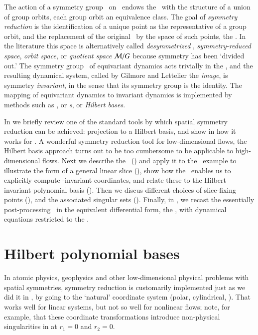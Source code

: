 
The action of a symmetry group \Group\ on \pS\ endows the \statesp\ with the structure of a union of group orbits, each group orbit an equivalence class. The goal of {\em symmetry reduction} is the identification of a unique point as the representative of a group orbit, and the replacement of the original \statesp\ by the space of such points, the {\em \reducedsp}. In the literature this space is alternatively called
\emph{desymmetrized \statesp},
\emph{symmetry-reduced space},
\emph{orbit space}, or \emph{quotient space}
${\cal M}/G$ because symmetry has been `divided out.'
{The} symmetry group \Group\ of equivariant dynamics acts trivially in {the} \reducedsp, and the resulting dynamical system, called by Gilmore and Lettelier the \emph{image}, is symmetry {\em invariant}, in the sense that its symmetry group is the identity. The mapping {of}  equivariant dynamics to invariant dynamics is implemented by methods such as
{\em \mframes},
{\em \mslices} or {\em \csection s}, or
{\em Hilbert bases}.

In  we briefly review one of the standard tools by which spatial symmetry reduction can be achieved: projection to a Hilbert basis, and show in  how it works for \cLf. A wonderful symmetry reduction tool for low-dimensional flows, the Hilbert basis approach turns out to be too cumbersome to be applicable to high-dimensional flows. Next we describe the \mframes\ () and apply it to the \cLf\ example to illustrate the form of a general linear slice (), show how the \mframes\ enables us to explicitly compute \Group-invariant coordinates, and relate these to the Hilbert invariant polynomial basis (). Then we discus different choices of slice-fixing points (), and the associated singular sets (). Finally, in , we recast the essentially post-processing \mframes\ in the equivalent differential form, the \mslices, with dynamical equations restricted to the \reducedsp.


\section{\label{s:Hilbert} Hilbert polynomial bases}

In atomic physics, geophysics and other
low-dimensional physical problems with spatial symmetries,
symmetry reduction is customarily implemented just as we
did it in , by going to the `natural'
coordinate system (polar, cylindrical, \etc). That works well
for linear systems, but not so well for nonlinear flows;
note, for example, that these coordinate transformations
introduce non-physical singularities
in  at $r_1=0$ and $r_2=0$.

